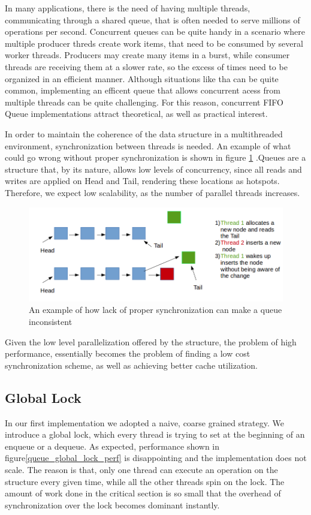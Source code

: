 In many applications, there is the need of having multiple threads, communicating through a shared queue, that is often needed to serve millions of operations per second. Concurrent queues can be quite handy in a scenario where multiple producer threds create work items, that need to be consumed by several worker threads. Producers may create many items in a burst, while consumer threads are receiving them at a slower rate, so the excess of times need to be organized in an efficient manner. Although situations like tha can be quite common, implementing an efficent queue that allows concurrent acess from multiple threads can be quite challenging. For this reason, concurrent FIFO Queue implementations attract theoretical, as well as practical interest. 
 
In order to maintain the coherence of the data structure in a multithreaded environment, synchronization between threads is needed. An example of what could go wrong without proper synchronization is shown in figure \ref{queue_no_sync} .Queues are a structure that, by its nature, allows low levels of concurrency, since all reads and writes are applied on Head and Tail, rendering these locations as hotspots. Therefore, we expect low scalability, as the number of parallel threads increases.

\begin{figure}
 \centering
  \includegraphics[scale=0.5]{queue_no_sync.png}
\caption{An example of how lack of proper synchronization can make a queue inconsistent}
\label{queue_no_sync}
\end{figure}

Given the low level parallelization offered by the structure, the problem of high performance, essentially becomes the problem of finding a low cost synchronization scheme, as well as achieving better cache utilization.

\subsection{Global Lock}
In our first implementation we adopted a naive, coarse grained strategy. We introduce a global lock, which every thread is trying to set at the beginning of an enqueue or a dequeue. As expected,  performance shown in figure\ref{queue_global_lock_perf} is disappointing and the implementation does not scale. The reason is that, only one thread can execute an operation on the structure every given time, while all the other threads spin on the lock. The amount of work done in the critical section is so small that the overhead of synchronization over the lock becomes dominant instantly.

